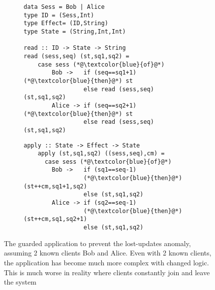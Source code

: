 \begin{figure}[h]
	\centering
	\begin{subfigure}[t]{0.5\textwidth}
	\begin{lstlisting}
data Sess = Bob | Alice
type ID = (Sess,Int) 
type Effect= (ID,String)
type State = (String,Int,Int)
	
read :: ID -> State -> String
read (sess,seq) (st,sq1,sq2) = 
	case sess (*@\textcolor{blue}{of}@*) 
		Bob ->   if (seq==sq1+1) (*@\textcolor{blue}{then}@*) st
		         else read (sess,seq)(st,sq1,sq2)
		Alice -> if (seq==sq2+1) (*@\textcolor{blue}{then}@*) st
		         else read (sess,seq)(st,sq1,sq2)
	\end{lstlisting}		  
	\end{subfigure}
	\hfill
	\begin{subfigure}[t]{0.42\textwidth}
	\begin{lstlisting}[firstnumber=13]
	apply :: State -> Effect -> State 
	apply (st,sq1,sq2) ((sess,seq),cm) = 
	  case sess (*@\textcolor{blue}{of}@*) 
	    Bob ->   if (sq1==seq-1)
	             (*@\textcolor{blue}{then}@*) (st++cm,sq1+1,sq2)
	             else (st,sq1,sq2)
	    Alice -> if (sq2==seq-1)
	             (*@\textcolor{blue}{then}@*) (st++cm,sq1,sq2+1)
	             else (st,sq1,sq2)
	\end{lstlisting}		  
        \end{subfigure}

	\hrulefill
	\caption*{The guarded application to prevent the lost-updates
	anomaly,
	assuming 2 known clients Bob and Alice. Even with
	2 known clients, the application has become much more complex
	with changed logic. This
	is much worse in reality where clients constantly join and leave the
	system}
	\label{fig:modified_code}
\end{figure}


